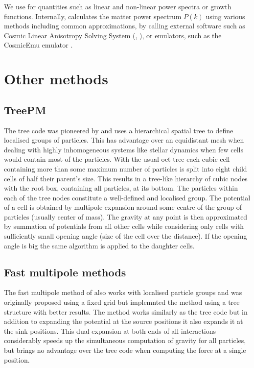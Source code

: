 We use  for quantities such as linear and non-linear power spectra or growth functions. Internally,  calculates the matter power spectrum  $P(k)$ using various methods including common approximations, by calling external software such as Cosmic Linear Anisotropy Solving System (, \textcite{class}), or emulators, such as the CosmicEmu emulator \parencite{Heitmann:2015xma}.

\section{Other methods}
\subsection{TreePM}
The tree code was pioneered by \textcite{1986Natur.324..446B} and uses a hierarchical spatial tree to define localised groups of particles. This has advantage over an equidistant mesh when dealing with highly inhomogeneous systems like stellar dynamics when few cells would contain most of the particles. With the usual oct-tree each cubic cell containing more than some maximum number of particles is split into eight child cells of half their parent's size. This results in a tree-like hierarchy of cubic nodes with the root box, containing all particles, at its bottom. The particles within each of the tree nodes constitute a well-defined and localised group. The potential of a cell is obtained by multipole expansion around some centre of the group of particles (usually center of mass). The gravity at any point is then approximated by summation of potentials from all other cells while considering only cells with sufficiently small opening angle (size of the cell over the distance). If the opening angle is big the same algorithm is applied to the daughter cells.
\subsection{Fast multipole methods}
The fast multipole method of \textcite{1987JCoPh..73..325G} also works with localised particle groups and was originally proposed using a fixed grid but \textcite{2000ApJ...536L..39D} implemnted the method using a tree structure with better results. The method works similarly as the tree code but in addition to expanding the potential at the source positions it also expands it at the sink positions. This dual expansion at both ends of all interactions considerably speeds up the simultaneous computation of gravity for all particles, but brings no advantage over the tree code when computing the force at a single position.


